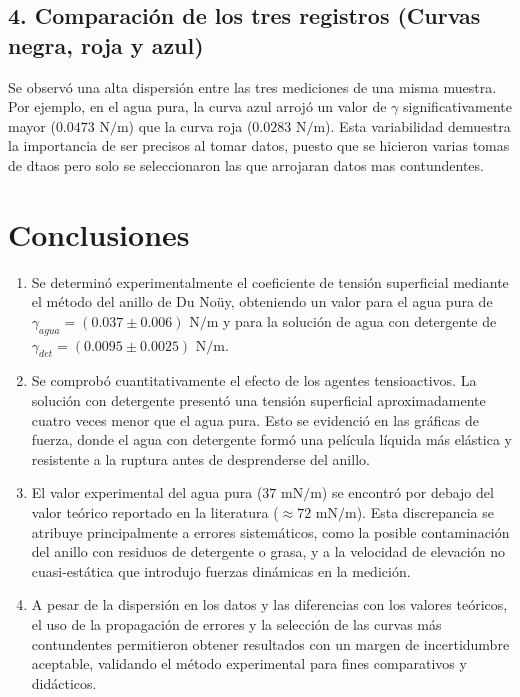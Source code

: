 \documentclass[11pt,a4paper]{article}
\begin{document}
\subsection*{4. Comparación de los tres registros (Curvas negra, roja y azul)}
Se observó una alta dispersión entre las tres mediciones de una misma muestra. Por ejemplo, en el agua pura, la curva azul arrojó un valor de \(\gamma\) significativamente mayor (\(0.0473 \text{ N/m}\)) que la curva roja (\(0.0283 \text{ N/m}\)). Esta variabilidad demuestra la 
importancia de ser precisos al tomar datos, puesto que se hicieron varias tomas de dtaos pero solo se seleccionaron las que arrojaran datos mas contundentes.

\newpage
\section{Conclusiones}

\begin{enumerate}
    \item Se determinó experimentalmente el coeficiente de tensión superficial mediante el método del anillo de Du Noüy, obteniendo un valor para el agua pura de \(\gamma_{agua} = (0.037 \pm 0.006) \text{ N/m}\) y para la solución de agua con detergente de \(\gamma_{det} = (0.0095 \pm 0.0025) \text{ N/m}\).

    \item Se comprobó cuantitativamente el efecto de los agentes tensioactivos. La solución con detergente presentó una tensión superficial aproximadamente cuatro veces menor que el agua pura. Esto se evidenció en las gráficas de fuerza, donde el agua con detergente formó una película líquida más elástica y resistente a la ruptura antes de desprenderse del anillo.

    \item El valor experimental del agua pura (\(37 \text{ mN/m}\)) se encontró por debajo del valor teórico reportado en la literatura (\(\approx 72 \text{ mN/m}\)). Esta discrepancia se atribuye principalmente a errores sistemáticos, como la posible contaminación del anillo con residuos de detergente o grasa, y a la velocidad de elevación no cuasi-estática que introdujo fuerzas dinámicas en la medición.

    \item A pesar de la dispersión en los datos y las diferencias con los valores teóricos, el uso de la propagación de errores y la selección de las curvas más contundentes permitieron obtener resultados con un margen de incertidumbre aceptable, validando el método experimental para fines comparativos y didácticos.
\end{enumerate}
\end{document}
